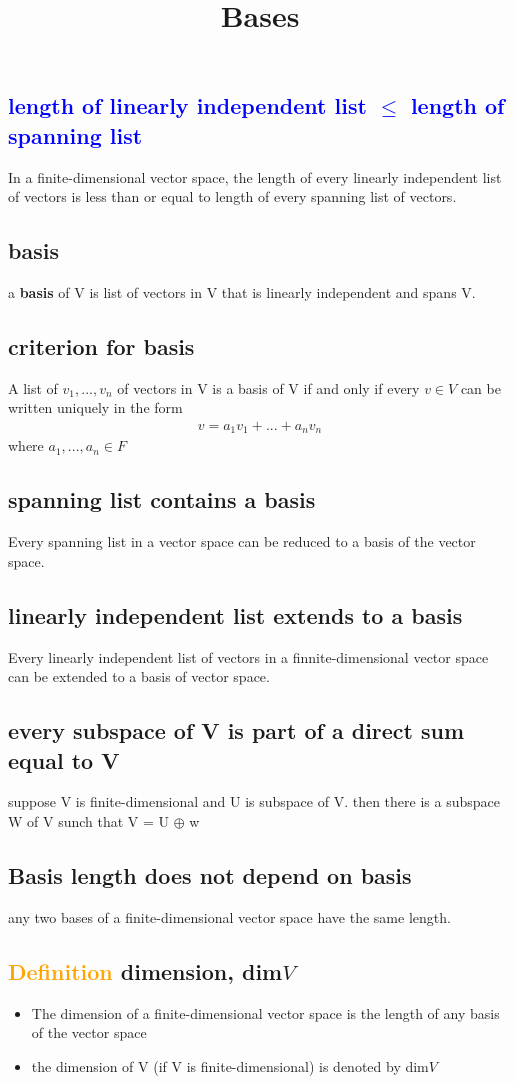 \documentclass[a4paper,12pt]{article}
\begin{document}
    \subsection{\textcolor{blue}{length of linearly independent list $\le$ length of spanning list}}
    In a finite-dimensional vector space, the length of every linearly independent list of vectors is less than
    or equal to length of every spanning list of vectors.
    \newpage
    \title {Bases}
    \subsection{\textbf{basis}}
    a \textbf{basis} of V is list of vectors in V that is linearly independent and spans V.
    \subsection{criterion for basis}
    A list of $v_1,...,v_n$ of vectors in V is a basis of V if and only if every $v \in V$ can be written uniquely in the form
    \begin{align*}
        v = a_1v_1 + ... + a_nv_n
    \end{align*}
    where $a_1,...,a_n \in F$
    \subsection{spanning list contains a basis}
    Every spanning list in a vector space can be reduced to a basis of the vector space.
    \subsection{linearly independent list extends to a basis}
    Every linearly independent list of vectors in a finnite-dimensional vector space can be extended to a basis of vector space.
    \subsection{every subspace of V is part of a direct sum equal to V}
    suppose V is finite-dimensional and U is subspace of V. then there is a subspace W of V sunch that V = U $\oplus$ w
    \subsection{Basis length does not depend on basis}
    any two bases of a finite-dimensional vector space have the same length.
    \subsection{\textcolor{orange}{Definition} \textbf{dimension}, dim$V$}
    \begin{itemize}
        \item The dimension of a finite-dimensional vector space is the length of any basis of the vector space
        \item the dimension of V (if  V is finite-dimensional) is denoted by dim$V$
    \end{itemize}
\end{document}
